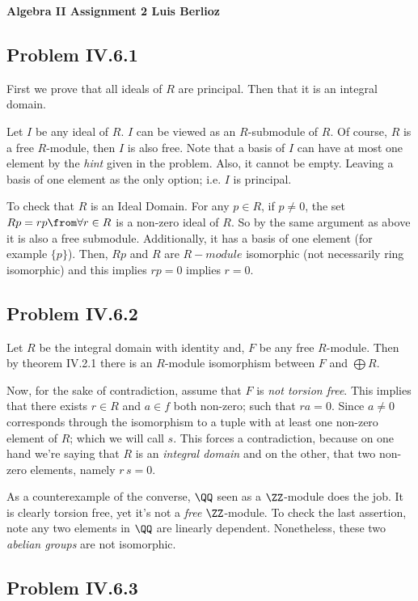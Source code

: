 \textbf{Algebra II Assignment 2 \hspace{\fill} Luis Berlioz}
\subsection*{Problem IV.6.1}
First we prove that all ideals of $R$ are principal. Then that it is an integral domain. 

Let $I$ be any ideal of $R$. $I$ can be viewed as an $R$-submodule of $R$. 
Of course, $R$ is a free $R$-module, then $I$ is also free.
Note that a basis of $I$ can have at most one element by the \emph{hint} given in the problem. 
Also, it cannot be empty. Leaving a basis of one element as the only option; i.e. $I$ is principal.

To check that $R$ is an Ideal Domain. 
For any $p\in R$, if $p\neq 0$, the set $Rp={rp\from \forall r\in R}$ is a non-zero ideal of $R$. 
So by the same argument as above it is also a free submodule. Additionally, it 
has a basis of one element (for example $\{p \}$). 
Then, $Rp$ and $R$  are $R-module$ isomorphic (not necessarily ring isomorphic) and this implies $rp=0$ implies $r=0$.

\subsection*{Problem IV.6.2}
Let $R$ be the integral domain with identity and, $F$ be any free $R$-module. 
Then by theorem IV.2.1 there is an $R$-module isomorphism between $F$ and $\bigoplus R$. 

Now, for the sake of contradiction, assume that $F$ is \emph{not torsion free}. This implies that there exists $r\in R$ and $a\in f$ both non-zero; such that $ra=0$.
 Since $a\neq 0$ corresponds through the isomorphism to a tuple with at least one non-zero element of $R$; which we will call $s$. 
This forces a contradiction, because on one hand we're saying that $R$ is an \emph{integral domain} and on the other, that two non-zero elements, namely $r\,s =0$. 

As a counterexample of the converse,  $\QQ$ seen as a $\ZZ$-module does the job. 
It is clearly torsion free, yet it's not a \emph{free} $\ZZ$-module.
To check the last assertion, note any two elements in $\QQ$ are linearly dependent. 
Nonetheless, these two \emph{abelian groups} are not isomorphic.

\subsection*{Problem IV.6.3}
